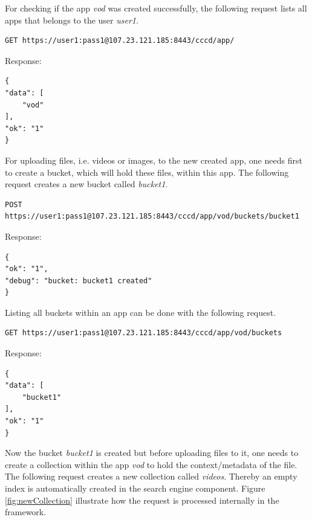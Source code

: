 For checking if the app \textit{vod} was created successfully, the following request lists all apps that belongs to the user \textit{user1}.

\begin{code}
\begin{verbatim}
GET https://user1:pass1@107.23.121.185:8443/cccd/app/
\end{verbatim}
Response:
\begin{verbatim}
{
"data": [
	"vod"
],
"ok": "1"
}
\end{verbatim}
\end{code}
 
For uploading files, i.e. videos or images, to the new created app, one needs first to create a bucket, which will hold these files, within this app. The following request creates a new bucket called \textit{bucket1}.

\begin{code}
\begin{verbatim}
POST https://user1:pass1@107.23.121.185:8443/cccd/app/vod/buckets/bucket1
\end{verbatim}
Response:
\begin{verbatim}
{
"ok": "1",
"debug": "bucket: bucket1 created"
}
\end{verbatim}
\end{code}

Listing all buckets within an app can be done with the following request.
\begin{code}
\begin{verbatim}
GET https://user1:pass1@107.23.121.185:8443/cccd/app/vod/buckets
\end{verbatim}
Response:
\begin{verbatim}
{
"data": [
	"bucket1"
],
"ok": "1"
}
\end{verbatim}
\end{code}

Now the bucket \textit{bucket1} is created but before uploading files to it, one needs to create a collection within the app \textit{vod} to hold the context/metadata of the file. The following request creates a new collection called \textit{videos}. Thereby an empty index is automatically created in the search engine component. Figure \ref{fig:newCollection} illustrate how the request is processed internally in the framework.

